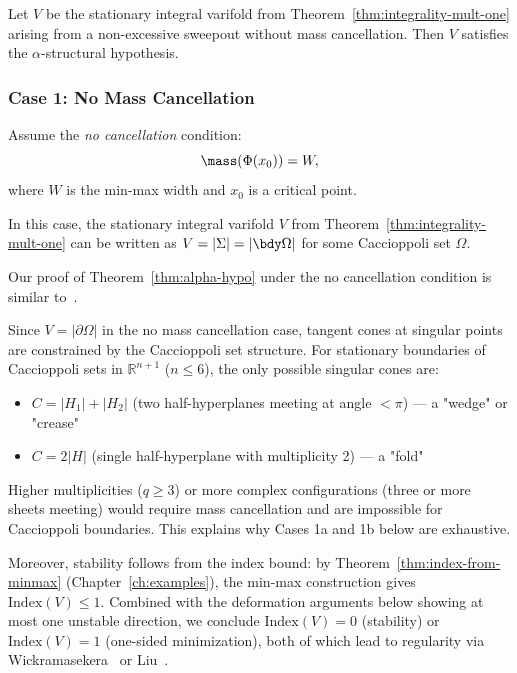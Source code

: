 \begin{theorem}\label{thm:alpha-hypo}
    Let $V$ be the stationary integral varifold from Theorem~\ref{thm:integrality-mult-one} arising from a
    non-excessive sweepout without mass cancellation. Then $V$ satisfies the $\alpha$-structural hypothesis.
\end{theorem}

\subsubsection{Case 1: No Mass Cancellation}

Assume the \emph{no cancellation} condition:
\begin{equation}
    \mass(\Phi(x_0)) = W,
\end{equation}
where $W$ is the min-max width and $x_0$ is a critical point.

In this case, the stationary integral varifold $V$ from Theorem~\ref{thm:integrality-mult-one} can be written as
$V = |\Sigma| = |\bdy\Omega|$ for some Caccioppoli set $\Omega$.

Our proof of Theorem~\ref{thm:alpha-hypo} under the no cancellation condition is similar to~\cite[Lemma 3.4]{CLS22}.

\begin{remark}

Since $V = |\partial\Omega|$ in the no mass cancellation case, tangent cones at singular points are constrained by the Caccioppoli set structure. For stationary boundaries of Caccioppoli sets in $\mathbb{R}^{n+1}$ ($n \leq 6$), the only possible singular cones are:
\begin{itemize}
    \item $C = |H_1| + |H_2|$ (two half-hyperplanes meeting at angle $< \pi$) — a "wedge" or "crease"
    \item $C = 2|H|$ (single half-hyperplane with multiplicity 2) — a "fold"
\end{itemize}
Higher multiplicities ($q \geq 3$) or more complex configurations (three or more sheets meeting) would require mass cancellation and are impossible for Caccioppoli boundaries. This explains why Cases 1a and 1b below are exhaustive.

Moreover, stability follows from the index bound: by Theorem~\ref{thm:index-from-minmax} (Chapter~\ref{ch:examples}), the min-max construction gives $\mathrm{Index}(V) \leq 1$. Combined with the deformation arguments below showing at most one unstable direction, we conclude $\mathrm{Index}(V) = 0$ (stability) or $\mathrm{Index}(V) = 1$ (one-sided minimization), both of which lead to regularity via Wickramasekera~\cite{Wic14} or Liu~\cite{Liu19}.
\end{remark}

